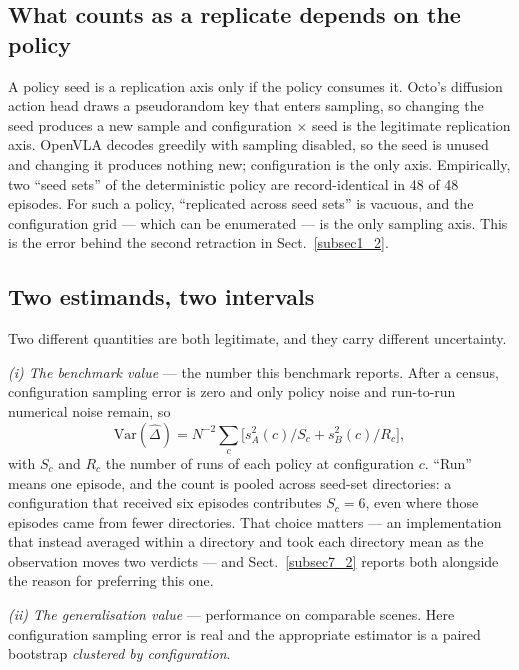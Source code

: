 \documentclass[pdflatex,iicol,sn-apa]{sn-jnl}
\theoremstyle{remark}
\begin{document}
\subsection{What counts as a replicate depends on the policy}\label{subsec5_3}

A policy seed is a replication axis only if the policy consumes it. Octo's diffusion action head
draws a pseudorandom key that enters sampling, so changing the seed produces a new sample and
configuration $\times$ seed is the legitimate replication axis. OpenVLA decodes greedily with
sampling disabled, so the seed is unused and changing it produces nothing new; configuration is the
only axis. Empirically, two ``seed sets'' of the deterministic policy are record-identical in 48 of
48 episodes. For such a policy, ``replicated across seed sets'' is vacuous, and the configuration
grid --- which can be enumerated --- is the only sampling axis. This is the error behind the second
retraction in Sect.~\ref{subsec1_2}.

\subsection{Two estimands, two intervals}\label{subsec5_4}

Two different quantities are both legitimate, and they carry different uncertainty.

\emph{(i) The benchmark value} --- the number this benchmark reports. After a census, configuration
sampling error is zero and only policy noise and run-to-run numerical noise remain, so
\begin{equation}\label{eq:var}
\mathrm{Var}(\hat\Delta) = N^{-2} \sum_{c} \big[ s^2_A(c)/S_c + s^2_B(c)/R_c \big],
\end{equation}
with $S_c$ and $R_c$ the number of runs of each policy at configuration $c$. ``Run'' means one
episode, and the count is pooled across seed-set directories: a configuration that received six
episodes contributes $S_c = 6$, even where those episodes came from fewer directories. That choice
matters --- an implementation that instead averaged within a directory and took each directory mean
as the observation moves two verdicts --- and Sect.~\ref{subsec7_2} reports both alongside the
reason for preferring this one.

\emph{(ii) The generalisation value} --- performance on comparable scenes. Here configuration
sampling error is real and the appropriate estimator is a paired bootstrap \emph{clustered by
configuration}.
\end{document}
